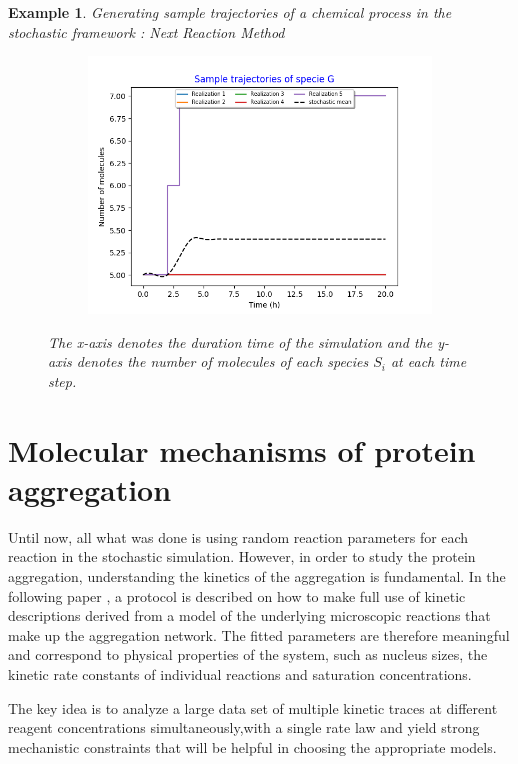 \documentclass[11pt,a4paper]{article}
\newtheorem{example}[theorem]{Example}
\begin{document}
\begin{example}{Generating sample trajectories of a chemical process in the stochastic framework : Next Reaction Method}
\begin{figure}[H]
\begin{subfigure}{.5\textwidth}
        \includegraphics[width=1.1\linewidth]{Images/g.png}
        \label{fig: Single sample trajectory}
    \end{subfigure}%
    \caption{The x-axis denotes the duration time of the simulation and the y-axis denotes the number of molecules of each species $S_{i}$ at each time step.}
    \end{figure}
\end{example}

\section {Molecular mechanisms of protein aggregation}
Until now, all what was done is using random reaction parameters for each reaction in the stochastic simulation. However, in order to study the protein aggregation, understanding the kinetics of the aggregation is fundamental. In the following paper \cite{meisl_molecular_2016}, a protocol is described on how to make full use of kinetic descriptions derived from a model of the underlying microscopic reactions that make up the aggregation network. The fitted parameters are therefore meaningful and correspond to physical properties of the system, such as nucleus sizes, the kinetic rate constants of individual reactions and saturation concentrations.

The key idea is to analyze a large data set of multiple kinetic traces at different reagent concentrations simultaneously,with a single rate law and yield strong mechanistic constraints that will be helpful in choosing the appropriate models.
\end{document}
